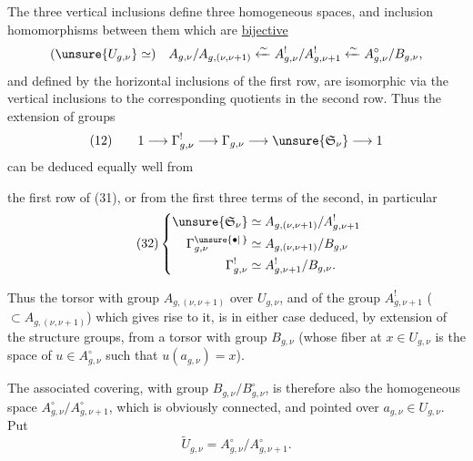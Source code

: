 The three vertical inclusions define three homogeneous spaces, and  inclusion homomorphisms between them which are \uline{bijective}
\[
(\unsure{U_{g,\nu}}\simeq)\quad
A_{g,\nu}/A_{g,(\nu,\nu+1)}
\xleftarrow{\sim} A_{g,\nu}^{!}/A_{g,\nu+1}^{!}
\xleftarrow{\sim} A_{g,\nu}^{\circ}/B_{g,\nu},
\]
and    defined by the horizontal inclusions of the first row, are isomorphic via the vertical inclusions to the corresponding quotients in the second row. Thus the extension of groups
\[
(12)\qquad 1\longrightarrow\Gamma_{g,\nu}^{!}\longrightarrow\Gamma_{g,\nu}\longrightarrow\unsure{\mathfrak S_\nu}\longrightarrow1
\]
can  be deduced equally well from

the first row of (31), or from the first three terms of the second, in particular
\[
\tag{32}
\left\{\begin{aligned}
\unsure{\mathfrak S_\nu}&\simeq A_{g,(\nu,\nu+1)}/A_{g,\nu+1}^{!}\\
\Gamma_{g,\nu}^{\unsure{\bullet|\,}}&\simeq A_{g,(\nu,\nu+1)}/B_{g,\nu}\\
\Gamma_{g,\nu}^{!}&\simeq A_{g,\nu+1}^{!}/B_{g,\nu}.
\end{aligned}\right.
\]

Thus the  torsor with group $A_{g,(\nu,\nu+1)}$  over  $U_{g,\nu}$, and  of the group $A_{g,\nu+1}^{!}$ ($\subset A_{g,(\nu,\nu+1)}$) which gives rise to it, is in either case deduced, by extension of the structure groups, from a torsor with group $B_{g,\nu}$ (whose fiber at $x\in U_{g,\nu}$ is the space of  $u\in A_{g,\nu}^{\circ}$ such that $u(a_{g,\nu})=x$).

The associated  covering, with group $B_{g,\nu}/B_{g,\nu}^{\circ}$, is therefore also the homogeneous space $A_{g,\nu}^{\circ}/A_{g,\nu+1}^{\circ}$, which is obviously connected, and pointed over $a_{g,\nu}\in U_{g,\nu}$. Put
\[
\tag{33}
\widetilde U_{g,\nu}=A_{g,\nu}^{\circ}/A_{g,\nu+1}^{\circ}.
\]

